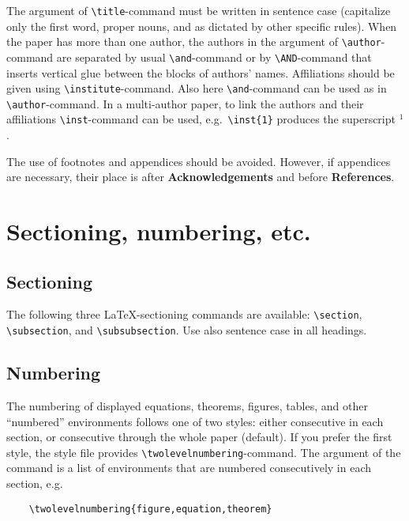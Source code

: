 \documentclass{DIKU-article}[2006/05/09]
\begin{document}
The argument of \verb|\title|-command must be written in sentence case
(capitalize only the first word, proper nouns, and as dictated by
other specific rules).  When the paper has more than one author, the
authors in the argument of \verb|\author|-command are separated by
usual \verb|\and|-command or by \verb|\AND|-command that inserts
vertical glue between the blocks of authors' names. Affiliations
should be given using \verb|\institute|-command. Also here
\verb|\and|-command can be used as in \verb|\author|-command. In a
multi-author paper, to link the authors and their affiliations
\verb|\inst|-command can be used, e.g.~\verb|\inst{1}| produces the
superscript $^1$.

The use of footnotes and appendices should be avoided.  However, if
appendices are necessary, their place is after
\textbf{Acknowledgements} and before \textbf{References}.

\section{Sectioning, numbering, etc.}

\subsection{Sectioning}

The following three \LaTeX-sectioning commands are available:
\verb|\section|, \verb|\subsection|, and \verb|\subsubsection|.
Use also sentence case in all headings.

\subsection{Numbering}
\label{numbering}

The numbering of displayed equations, theorems, figures, tables, and
other ``numbered'' environments follows one of two styles: either
consecutive in each section, or consecutive through the whole paper
(default).  If you prefer the first style, the style file provides
\verb|\twolevelnumbering|-command.  The argument of the command is a
list of environments that are numbered consecutively in each section,
e.g.
\begin{verbatim}
    \twolevelnumbering{figure,equation,theorem}
\end{verbatim}
\end{document}
